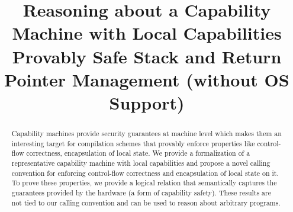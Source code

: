 \documentclass[compsoc,conference,letterpaper,fleqn]{IEEEtran}
\begin{document}
\setlength{\mathindent}{.2cm}

\title{Reasoning about a Capability Machine with Local Capabilities\\
 Provably Safe Stack and Return Pointer Management (without OS Support)}


\author{}
\maketitle

\begin{abstract}  
  Capability machines provide security guarantees at machine level which makes
  them an interesting target for compilation schemes that provably enforce
  properties like control-flow correctness, encapsulation of local state. We
  provide a formalization of a representative capability machine with local
  capabilities and propose a novel calling convention for enforcing control-flow
  correctness and encapsulation of local state on it. To prove these properties,
  we provide a logical relation that semantically captures the guarantees
  provided by the hardware (a form of capability safety). These results are not
  tied to our calling convention and can be used to reason about arbitrary
  programs.
\end{abstract}




\end{document}
